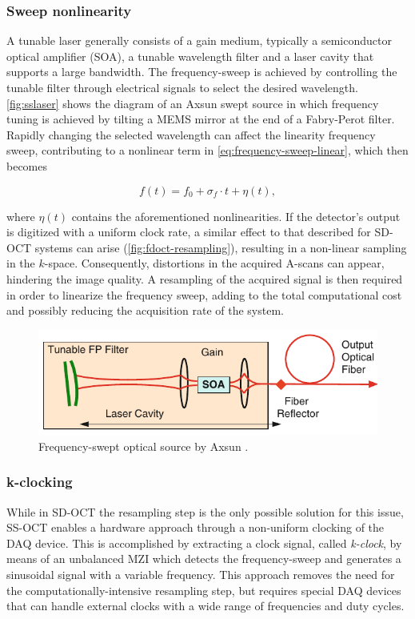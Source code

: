 \subsubsection{Sweep nonlinearity}
A tunable laser generally consists of a gain medium, typically a semiconductor optical amplifier (\acs{SOA}), a tunable wavelength filter and a laser cavity that supports a large bandwidth. The frequency-sweep is achieved by controlling the tunable filter through electrical signals to select the desired wavelength. \autoref{fig:sslaser} shows the diagram of an Axsun swept source in which frequency tuning is achieved by tilting a \ac{MEMS} mirror at the end of a Fabry-Perot filter. Rapidly changing the selected wavelength can affect the linearity frequency sweep, contributing to a nonlinear term in \autoref{eq:frequency-sweep-linear}, which then becomes

\begin{equation}
	f(t) = f_0 + \sigma_f \cdot t + \eta (t),
\end{equation}

where $\eta(t)$ contains the aforementioned nonlinearities. If the detector's output is digitized with a uniform clock rate, a similar effect to that described for \ac{SD-OCT} systems can arise (\autoref{fig:fdoct-resampling}), resulting in a non-linear sampling in the $k$-space. Consequently, distortions in the acquired A-scans can appear, hindering the image quality. A resampling of the acquired signal is then required in order to linearize the frequency sweep, adding to the total computational cost and possibly reducing the acquisition rate of the system. 


\begin{figure}[hbt]
	\myfloatalign
	\includegraphics[width=0.7\linewidth]{gfx/ch2/sslaser}
	\caption{Frequency-swept optical source by Axsun \cite{Drexler2015}.}\label{fig:sslaser}
\end{figure}

\subsubsection{k-clocking}

While in \ac{SD-OCT} the resampling step is the only possible solution for this issue, \ac{SS-OCT} enables a hardware approach through a non-uniform clocking of the \ac{DAQ} device. This is accomplished by extracting a clock signal, called \emph{k-clock}, by means of an unbalanced \acf{MZI} which detects the frequency-sweep and generates a sinusoidal signal with a variable frequency. This approach removes the need for the computationally-intensive resampling step, but requires special \ac{DAQ} devices that can handle external clocks with a wide range of frequencies and duty cycles.  

